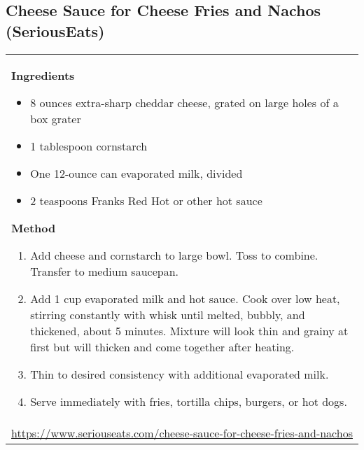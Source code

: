 \documentclass[web-recipes.tex]{subfiles}
\begin{document}
\renewcommand{\mytitle}{Cheese Sauce for Cheese Fries and Nachos (SeriousEats)}
\renewcommand{\myurl}{https://www.seriouseats.com/cheese-sauce-for-cheese-fries-and-nachos}
    \begin{mdframed}[nobreak]
      \section{\mytitle}
      \begin{tabular}{l}
        \begin{minipage}[t]{0.35\textwidth}
          {\sffamily\bfseries Ingredients}\vspace{0.5ex}
              \begin{itemize}
                \item 8 ounces extra-sharp cheddar cheese, grated on large holes of a box grater
                \item 1 tablespoon cornstarch
                \item One 12-ounce can evaporated milk, divided
                \item 2 teaspoons Franks Red Hot or other hot sauce
              \end{itemize}
        \end{minipage}
        \qquad
        \begin{minipage}[t]{0.55\textwidth}
          {\sffamily\bfseries Method}\vspace{0.5ex}
          \begin{enumerate}
            \item Add cheese and cornstarch to large bowl. Toss to combine.
              Transfer to medium saucepan.
            \item Add 1 cup evaporated milk and hot sauce. Cook over low heat,
              stirring constantly with whisk until melted, bubbly, and
              thickened, about 5 minutes. Mixture will look thin and grainy at
              first but will thicken and come together after heating.
            \item Thin to desired consistency with additional evaporated milk.
            \item Serve immediately with fries, tortilla chips, burgers, or hot
              dogs.
          \end{enumerate}
        \end{minipage} \vspace{3ex}\\
        \multicolumn{1}{c}{\small\ttfamily \url{\myurl}} \\
      \end{tabular}
    \end{mdframed}
    
\end{document}

